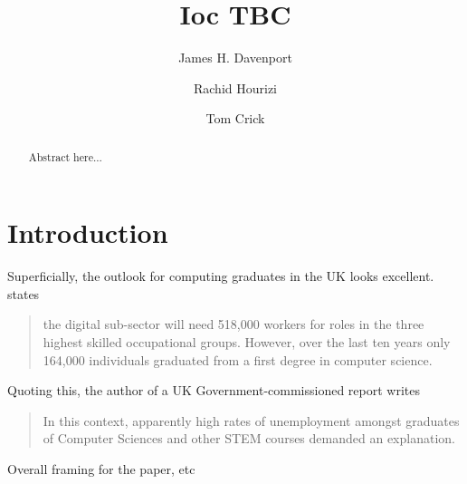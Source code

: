\documentclass[sigconf]{acmart}
\begin{document}
\title{Ioc TBC}

\author{James H. Davenport}

\author{Rachid Hourizi}

\author{Tom Crick}

 


\begin{abstract}
Abstract here...
\end{abstract}


\maketitle


\section{Introduction}
Superficially, the outlook for computing graduates in the UK looks excellent. \cite[p.~74]{UKCES2015b} states
\begin{quote}
the digital sub-sector will need 518,000 workers for roles in the three highest skilled occupational groups. However, over the last ten years only 164,000 individuals graduated from a first degree in computer science.
\end{quote}
Quoting this, the author of a UK Government-commissioned report \cite{Shadbolt2016a} writes
\begin{quote}
In this context, apparently high rates of unemployment amongst graduates of Computer Sciences and other STEM courses demanded an explanation.
\end{quote}
Overall framing for the paper, etc
\end{document}
